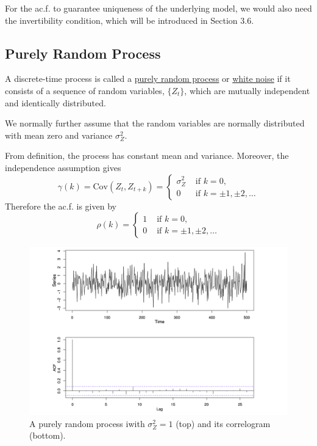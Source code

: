 For the ac.f. to guarantee uniqueness of the underlying model, we would also need the invertibility condition, 
which will be introduced in Section 3.6.



\subsection{Purely Random Process}
\begin{definition*}[]
A discrete-time process is called a \underline{purely random process} or \underline{white noise} if it consists 
of a sequence of random 
variables, $\{ Z_t \}$, which are mutually independent and identically distributed.
\end{definition*}
We normally further assume that the random variables are normally distributed with mean zero and variance 
$\sigma_Z^2$.

From definition, the process has constant mean and variance. Moreover, the independence assumption gives 
\[ \gamma(k) = \mathrm{Cov}(Z_t, Z_{t+k}) = \begin{cases}
	\sigma_Z^2 &\text{ if } k = 0, \\
	0 &\text{ if } k = \pm 1, \pm 2, \dots
\end{cases} \]
Therefore the ac.f. is given by 
\[ \rho(k) = \begin{cases}
	1 &\text{ if } k = 0, \\
	0 &\text{ if } k = \pm 1, \pm 2, \dots
\end{cases} \]

\begin{figure}[h]
	\centering
	\includegraphics[width=\textwidth]{Chapter 3/fig3-1}
	\caption{A purely random process iwith $\sigma_Z^2 = 1$ (top) and its correlogram (bottom).}
	\label{fig:3.1}
\end{figure}

